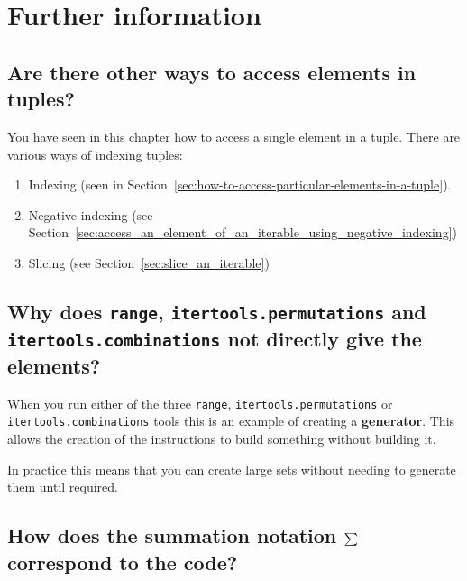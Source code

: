 \section{Further information}
\label{\detokenize{tools-for-mathematics/05-combinations-permutations/why/main:further-information}}\label{\detokenize{tools-for-mathematics/05-combinations-permutations/why/main::doc}}

\subsection{Are there other ways to access elements in tuples?}
\label{\detokenize{tools-for-mathematics/05-combinations-permutations/why/main:are-there-other-ways-to-access-elements-in-tuples}}

You have seen in this chapter how to access a single element in a tuple. There
are various ways of indexing tuples:
\begin{enumerate}

\item 

Indexing (seen in Section~\ref{sec:how-to-access-particular-elements-in-a-tuple}).

\item 

Negative indexing (see Section~\ref{sec:access_an_element_of_an_iterable_using_negative_indexing})

\item 

Slicing (see Section~\ref{sec:slice_an_iterable})

\end{enumerate}


\subsection{Why does \texttt{range}, \texttt{itertools.permutations} and \texttt{itertools.combinations} not directly give the elements?}

When you run either of the three \texttt{range}, \texttt{itertools.permutations} or
\texttt{itertools.combinations} tools this is an example of creating a \textbf{generator}.
This allows the creation of the instructions to build something without building
it.


In practice this means that you can create large sets without needing to generate
them until required.


\subsection{How does the summation notation \protect\(\sum\protect\) correspond to the code?}
\label{\detokenize{tools-for-mathematics/05-combinations-permutations/why/main:how-does-the-summation-notation-sum-correspond-to-the-code}}

